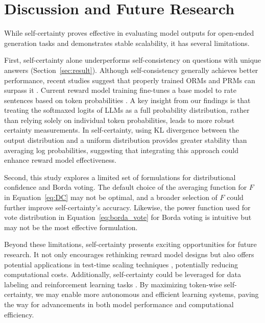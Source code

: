 
\section{Discussion and Future Research}
While self-certainty proves effective in evaluating model outputs for open-ended generation tasks and demonstrates stable scalability, it has several limitations.

First, self-certainty alone underperforms self-consistency on questions with unique answers (Section~\ref{sec:result}). Although self-consistency generally achieves better performance, recent studies suggest that properly trained ORMs and PRMs can surpass it \cite{lightman2023let,uesato2022solving}. Current reward model training fine-tunes a base model to rate sentences based on token probabilities \cite{wang2024math}. A key insight from our findings is that treating the softmaxed logits of LLMs as a full probability distribution, rather than relying solely on individual token probabilities, leads to more robust certainty measurements. In self-certainty, using KL divergence between the output distribution and a uniform distribution provides greater stability than averaging log probabilities, suggesting that integrating this approach could enhance reward model effectiveness.

Second, this study explores a limited set of formulations for distributional confidence and Borda voting. The default choice of the averaging function for $F$ in Equation~\ref{eq:DC} may not be optimal, and a broader selection of $F$ could further improve self-certainty’s accuracy. Likewise, the power function used for vote distribution in Equation~\ref{eq:borda_vote} for Borda voting is intuitive but may not be the most effective formulation.

Beyond these limitations, self-certainty presents exciting opportunities for future research. It not only encourages rethinking reward model designs but also offers potential applications in test-time scaling techniques \cite{snell2024scaling}, potentially reducing computational costs. Additionally, self-certainty could be leveraged for data labeling and reinforcement learning tasks \cite{bai2022training,ouyang2022training}. By maximizing token-wise self-certainty, we may enable more autonomous and efficient learning systems, paving the way for advancements in both model performance and computational efficiency.

